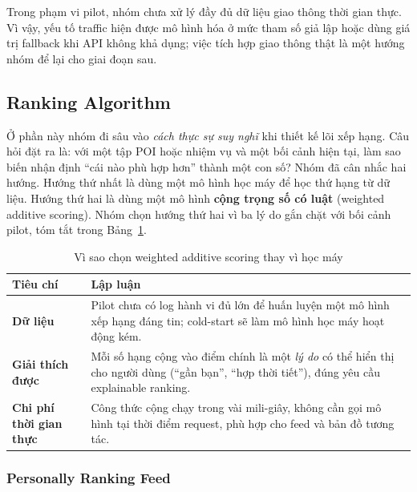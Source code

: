 \begin{note}
Trong phạm vi pilot, nhóm chưa xử lý đầy đủ dữ liệu giao thông thời gian
thực. Vì vậy, yếu tố traffic hiện được mô hình hóa ở mức tham số giả lập
hoặc dùng giá trị fallback khi API không khả dụng; việc tích hợp giao
thông thật là một hướng nhóm để lại cho giai đoạn sau.
\end{note}

\subsection{Ranking Algorithm}
\contrib

Ở phần này nhóm đi sâu vào \textit{cách thực sự suy nghĩ} khi thiết kế
lõi xếp hạng. Câu hỏi đặt ra là: với một tập POI hoặc nhiệm vụ và một bối
cảnh hiện tại, làm sao biến nhận định ``cái nào phù hợp hơn'' thành một
con số? Nhóm đã cân nhắc hai hướng. Hướng thứ nhất là dùng một mô hình
học máy để học thứ hạng từ dữ liệu. Hướng thứ hai là dùng một mô hình
\textbf{cộng trọng số có luật} (weighted additive scoring). Nhóm chọn
hướng thứ hai vì ba lý do gắn chặt với bối cảnh pilot, tóm tắt trong
Bảng~\ref{tab:why_rule_scoring}.

\begin{table}[H]
\centering
\caption{Vì sao chọn weighted additive scoring thay vì học máy}
\label{tab:why_rule_scoring}
\begin{tabularx}{\textwidth}{>{\raggedright\arraybackslash}p{3.2cm} X}
\toprule
\textbf{Tiêu chí} & \textbf{Lập luận} \\
\midrule
\textbf{Dữ liệu} & Pilot chưa có log hành vi đủ lớn để huấn luyện một mô hình xếp hạng đáng tin; cold-start sẽ làm mô hình học máy hoạt động kém. \\
\textbf{Giải thích được} & Mỗi số hạng cộng vào điểm chính là một \textit{lý do} có thể hiển thị cho người dùng (``gần bạn'', ``hợp thời tiết''), đúng yêu cầu explainable ranking. \\
\textbf{Chi phí thời gian thực} & Công thức cộng chạy trong vài mili-giây, không cần gọi mô hình tại thời điểm request, phù hợp cho feed và bản đồ tương tác. \\
\bottomrule
\end{tabularx}
\end{table}

\subsubsection{Personally Ranking Feed}
\contrib

